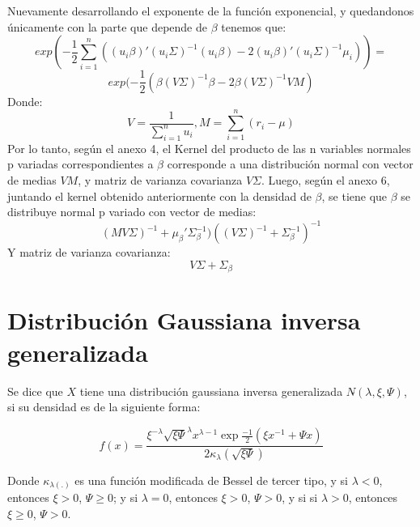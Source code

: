 \documentclass[11pt]{book}
\begin{document}
Nuevamente desarrollando el exponente de la función exponencial, y quedandonos únicamente con la parte que depende de $\beta$ tenemos que:
\begin{equation*}
exp(-\dfrac{1}{2}\sum_{i=1}^{n}((u_{i}\beta)'(u_{i}\Sigma)^{-1}(u_{i}\beta)-2(u_{i}\beta)'(u_{i}\Sigma)^{-1}\mu_{i}))=
\end{equation*}
\begin{equation*}
exp(-\dfrac{1}{2}(\beta(V\Sigma)^{-1}\beta-2\beta(V\Sigma)^{-1}VM)
\end{equation*}
Donde:
\begin{equation*}
V=\frac{1}{\sum_{i=1}^{n}u_{i}} , M=\sum_{i=1}^{n}(r_{i}-\mu)
\end{equation*}
 Por lo tanto, según el anexo 4, el Kernel del producto de las n variables normales p variadas correspondientes a $\beta$ corresponde a una distribución normal con vector de medias $VM$, y matriz de varianza covarianza $V\Sigma$.
Luego, según el anexo 6, juntando el kernel obtenido anteriormente con la densidad de $\beta$, se tiene que $\beta$ se distribuye normal p variado con vector de medias: 
\begin{equation*}
(MV\Sigma)^{-1}+\mu_{\beta}'\Sigma_{\beta}^{-1})((V\Sigma)^{-1}+\Sigma_{\beta}^{-1})^{-1}
\end{equation*}
Y matriz de varianza covarianza:
\begin{equation*}
V\Sigma+\Sigma_{\beta}
\end{equation*}

\pagebreak

\section*{Distribución Gaussiana inversa generalizada}
Se dice que $X$ tiene una distribución gaussiana inversa generalizada $N\tilde{}(\lambda,\xi,\Psi)$, si su densidad es de la siguiente forma:

\begin{equation*}
f(x)= \dfrac{\xi^{-\lambda}\sqrt{\xi\Psi}^{\lambda}x^{\lambda-1}\exp{\frac{-1}{2}(\xi x^{-1} + \Psi x)}}{2\kappa_{\lambda}(\sqrt{\xi\Psi})}  
\end{equation*}

Donde $\kappa_{\lambda(.)}$ es una función modificada de Bessel de tercer tipo, y si $\lambda<0$, entonces $\xi>0$, $\Psi \ge 0 $; y si $\lambda=0$, entonces $\xi>0$, $\Psi > 0 $, y si si $\lambda>0$, entonces $\xi\ge 0$, $\Psi > 0 $.\\
\end{document}
